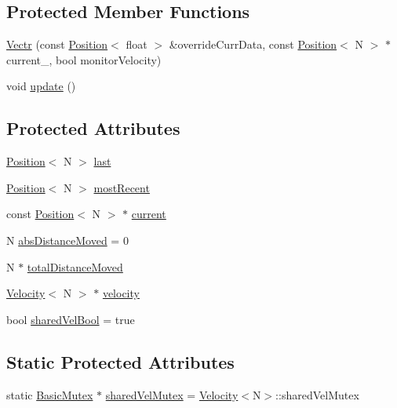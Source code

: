 \subsection*{Protected Member Functions}
\begin{DoxyCompactItemize}
\item 
\hyperlink{struct_vectr_ae04cf340dddfe1cd05c8dec90e34dd4a}{Vectr} (const \hyperlink{struct_position}{Position}$<$ float $>$ \&override\-Curr\-Data, const \hyperlink{struct_position}{Position}$<$ N $>$ $\ast$current\-\_\-, bool monitor\-Velocity)
\item 
void \hyperlink{struct_vectr_a072798a344fe237c3456f1e962f18672}{update} ()
\end{DoxyCompactItemize}
\subsection*{Protected Attributes}
\begin{DoxyCompactItemize}
\item 
\hyperlink{struct_position}{Position}$<$ N $>$ \hyperlink{struct_vectr_a42723f75b3084b9285cbd205388ba90e}{last}
\item 
\hyperlink{struct_position}{Position}$<$ N $>$ \hyperlink{struct_vectr_a1ef69f90f664d37b4281a02d12b08693}{most\-Recent}
\item 
const \hyperlink{struct_position}{Position}$<$ N $>$ $\ast$ \hyperlink{struct_vectr_ae3215bf0713f2bb9a40f60c0215b4b83}{current}
\item 
N \hyperlink{struct_vectr_a4634576eedac8a5b4651991e0c1f0d4d}{abs\-Distance\-Moved} = 0
\item 
N $\ast$ \hyperlink{struct_vectr_a577bdf47f67b34585ee08696679b2232}{total\-Distance\-Moved}
\item 
\hyperlink{struct_velocity}{Velocity}$<$ N $>$ $\ast$ \hyperlink{struct_vectr_aef611170eac7b1341ff345b9bb108eb7}{velocity}
\item 
bool \hyperlink{struct_vectr_a2dc13bbf566571029a2069a87d165b30}{shared\-Vel\-Bool} = true
\end{DoxyCompactItemize}
\subsection*{Static Protected Attributes}
\begin{DoxyCompactItemize}
\item 
static \hyperlink{class_basic_mutex}{Basic\-Mutex} $\ast$ \hyperlink{struct_vectr_a1cc9dc723075fb24116b6a78ac73e786}{shared\-Vel\-Mutex} = \hyperlink{struct_velocity}{Velocity}$<$N$>$\-::shared\-Vel\-Mutex
\end{DoxyCompactItemize}



